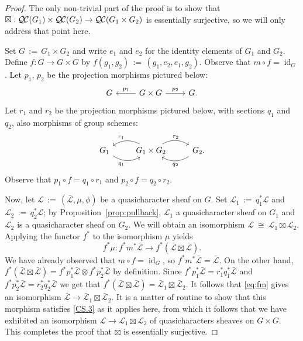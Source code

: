 \documentclass[11pt]{amsart}
\theoremstyle{plain}
\theoremstyle{definition}
\theoremstyle{remark}
\DeclareMathOperator{\id}{id}
\newcommand{\ceq}{{\, :=\, }}
\newcommand{\iso}{{\ \cong\ }}
\newcommand{\qcs}[1]{{\mathcal{#1}}}
\newcommand{\gqcs}[1]{{\mathcal{\bar #1}}}
\newcommand{\QC}{{\mathcal{Q\hskip-0.8pt C}}}
\begin{document}
\begin{proof}
The only non-trivial part of the proof is to show that $\boxtimes : \QC(G_1)\times \QC(G_2) \to \QC(G_1\times G_2)$ is essentially surjective, so we will only address that point here.

Set $G \ceq G_1\times G_2$
and write $e_1$ and $e_2$ for the identity elements of $G_1$ and $G_2$.
Define $f : G\to G\times G$ by $f(g_1,g_2) \ceq (g_1,e_2,e_1,g_2)$. 
Observe that $m\circ f = \id_G$. 
Let $p_1$, $p_2$ be the projection morphisms pictured below:
\[
\begin{tikzcd}
G & \arrow[swap]{l}{p_1} G\times G \arrow{r}{p_2} & G.
\end{tikzcd}
\]
Let $r_1$ and $r_2$ be the projection morphisms pictured below, with sections $q_1$ and $q_2$, also morphisms of group schemes:
\[
\begin{tikzcd}
G_1  \arrow[swap, bend right]{r}{q_1} &
\arrow[swap, bend right]{l}{r_1} G_1\times G_2 \arrow[bend left]{r}{r_2} &
\arrow[bend left]{l}{q_2} G_2.
\end{tikzcd}
\]
Observe that $p_1\circ f = q_1 \circ r_1$ and $p_2 \circ f = q_2\circ r_2$.

Now, let $\qcs{L} \ceq (\gqcs{L},\mu,\phi)$ be a quasicharacter sheaf on $G$. 
Set $\qcs{L}_1 \ceq q_1^* \qcs{L}$ and $\qcs{L}_2 \ceq q_2^* \qcs{L}$;
by Proposition~\ref{prop:pullback}, $\qcs{L}_1$ a quasicharacter sheaf on $G_1$ 
and $\qcs{L}_2$ is a quasicharacter sheaf on $G_2$.
We will obtain an isomorphism $\qcs{L} \iso  \qcs{L}_1\boxtimes \qcs{L}_2$.
%
Applying the functor $f^*$ to the isomorphism $\mu$ yields
\begin{equation}\label{eq:fm}
f^*\mu : f^* m^* \gqcs{L} \to f^*(\gqcs{L}\boxtimes \gqcs{L}) .
\end{equation}
We have already observed that $m\circ f = \id_G$, so $f^* m^* \gqcs{L} = \gqcs{L}$.
On the other hand, $f^*(\gqcs{L}\boxtimes \gqcs{L}) = f^*p_1^*\gqcs{L}\otimes f^* p_2^*\gqcs{L}$
by definition.  Since $f^*p_1^*\gqcs{L} = r_1^* q_1^* \gqcs{L}$ and $f^*p_2^*\gqcs{L} = r_2^* q_2^* \gqcs{L}$
we get that $f^*(\gqcs{L}\boxtimes \gqcs{L}) = \gqcs{L}_1\boxtimes \gqcs{L}_2$.
It follows that \eqref{eq:fm} gives an isomorphism $\gqcs{L} \to  \gqcs{L}_1\boxtimes \gqcs{L}_2$.
It is a matter of routine to show that this morphism satisfies 
\ref{CS.3} as it applies here,
from which it follows that we have exhibited an isomorphism 
$\qcs{L} \to \qcs{L}_1\boxtimes \qcs{L}_2$ of quasicharacters sheaves on $G\times G$.
This completes the proof that $\boxtimes$ is essentially surjective.
\end{proof}
\end{document}
